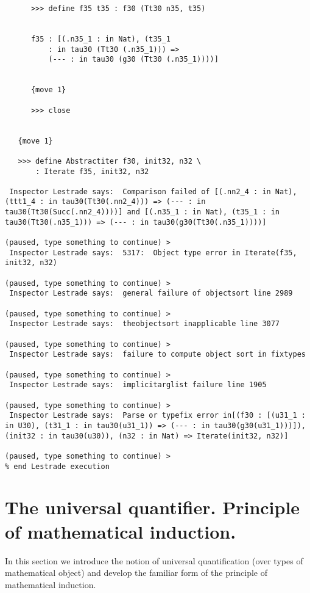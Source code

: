 \documentclass[12pt]{article}
\begin{document}
\begin{verbatim}
      >>> define f35 t35 : f30 (Tt30 n35, t35)


      f35 : [(.n35_1 : in Nat), (t35_1 
          : in tau30 (Tt30 (.n35_1))) => 
          (--- : in tau30 (g30 (Tt30 (.n35_1))))]


      {move 1}

      >>> close


   {move 1}

   >>> define Abstractiter f30, init32, n32 \
       : Iterate f35, init32, n32

 Inspector Lestrade says:  Comparison failed of [(.nn2_4 : in Nat), (ttt1_4 : in tau30(Tt30(.nn2_4))) => (--- : in tau30(Tt30(Succ(.nn2_4))))] and [(.n35_1 : in Nat), (t35_1 : in tau30(Tt30(.n35_1))) => (--- : in tau30(g30(Tt30(.n35_1))))]

(paused, type something to continue) >
 Inspector Lestrade says:  5317:  Object type error in Iterate(f35, init32, n32)

(paused, type something to continue) >
 Inspector Lestrade says:  general failure of objectsort line 2989

(paused, type something to continue) >
 Inspector Lestrade says:  theobjectsort inapplicable line 3077

(paused, type something to continue) >
 Inspector Lestrade says:  failure to compute object sort in fixtypes

(paused, type something to continue) >
 Inspector Lestrade says:  implicitarglist failure line 1905

(paused, type something to continue) >
 Inspector Lestrade says:  Parse or typefix error in[(f30 : [(u31_1 : in U30), (t31_1 : in tau30(u31_1)) => (--- : in tau30(g30(u31_1)))]), (init32 : in tau30(u30)), (n32 : in Nat) => Iterate(init32, n32)]

(paused, type something to continue) >
% end Lestrade execution
\end{verbatim}

\section{The universal quantifier.  Principle of mathematical induction.}

In this section we introduce the notion of universal quantification (over types of mathematical object)  and develop the familiar form of the principle of mathematical induction.
\end{document}
